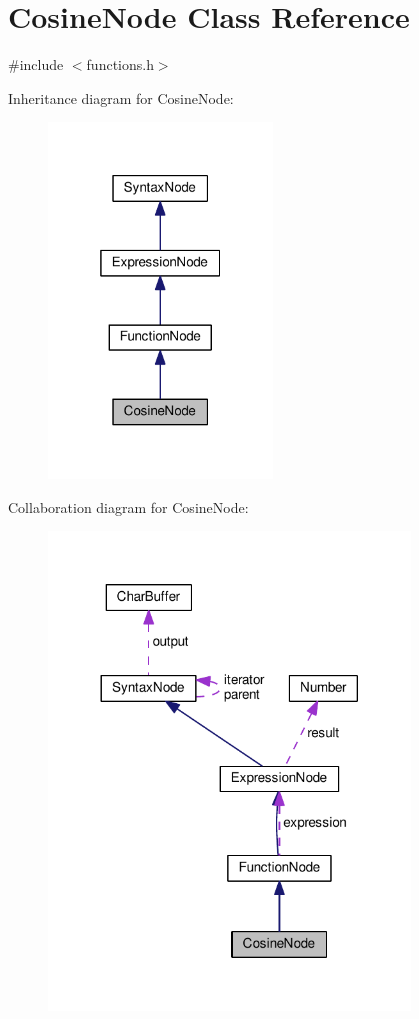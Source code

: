 \hypertarget{classCosineNode}{}\section{Cosine\+Node Class Reference}
\label{classCosineNode}


{\ttfamily \#include $<$functions.\+h$>$}



Inheritance diagram for Cosine\+Node\+:
\nopagebreak
\begin{figure}[H]
\begin{center}
\leavevmode
\includegraphics[width=169pt]{d5/dd6/classCosineNode__inherit__graph}
\end{center}
\end{figure}


Collaboration diagram for Cosine\+Node\+:
\nopagebreak
\begin{figure}[H]
\begin{center}
\leavevmode
\includegraphics[width=272pt]{d4/d1a/classCosineNode__coll__graph}
\end{center}
\end{figure}
